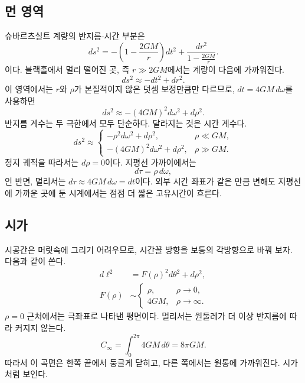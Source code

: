 \subsection{먼 영역}

슈바르츠실트 계량의 반지름-시간 부분은
\begin{equation}
ds^2
=-\left(1-\frac{2GM}{r}\right)dt^2
+\frac{dr^2}{1-\frac{2GM}{r}}.
\label{eq:l04-schwarzschild}
\end{equation}
이다. 블랙홀에서 멀리 떨어진 곳, 즉 \(r\gg2GM\)에서는 계량이 다음에 가까워진다.
\begin{equation}
ds^2\approx-dt^2+dr^2.
\end{equation}
이 영역에서는 \(r\)와 \(\rho\)가 본질적이지 않은 덧셈 보정만큼만 다르므로, \(dt=4GM\,d\omega\)를 사용하면
\begin{equation}
ds^2\approx-(4GM)^2d\omega^2+d\rho^2.
\label{eq:l04-far}
\end{equation}
반지름 계수는 두 극한에서 모두 단순하다. 달라지는 것은 시간 계수다.
\begin{equation}
ds^2\approx
\begin{cases}
-\rho^2d\omega^2+d\rho^2, & \rho\ll GM,\\[3pt]
-(4GM)^2d\omega^2+d\rho^2, & \rho\gg GM.
\end{cases}
\label{eq:l04-two-limits}
\end{equation}
정지 궤적을 따라서는 \(d\rho=0\)이다. 지평선 가까이에서는
\begin{equation}
d\tau=\rho\,d\omega,
\end{equation}
인 반면, 멀리서는 \(d\tau\approx4GM\,d\omega=dt\)이다. 외부 시간 좌표가 같은 만큼 변해도 지평선에 가까운 곳에 둔 시계에서는 점점 더 짧은 고유시간이 흐른다.

\subsection{시가}

시공간은 머릿속에 그리기 어려우므로, 시간꼴 방향을 보통의 각방향으로 바꿔 보자. 다음과 같이 쓴다.
\begin{equation}
\begin{aligned}
d\ell^2&=F(\rho)^2d\theta^2+d\rho^2,\\
F(\rho)&\sim
\begin{cases}
\rho, & \rho\to0,\\
4GM, & \rho\to\infty.
\end{cases}
\end{aligned}
\label{eq:l04-cigar}
\end{equation}
\(\rho=0\) 근처에서는 극좌표로 나타낸 평면이다. 멀리서는 원둘레가 더 이상 반지름에 따라 커지지 않는다.
\begin{equation}
C_\infty=\int_0^{2\pi}4GM\,d\theta=8\pi GM.
\label{eq:l04-cigar-circumference}
\end{equation}
따라서 이 곡면은 한쪽 끝에서 둥글게 닫히고, 다른 쪽에서는 원통에 가까워진다. 시가처럼 보인다.

